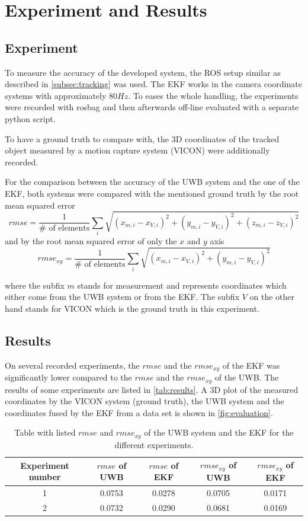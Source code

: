 \chapter{Experiment and Results}

\section{Experiment}
To measure the accuracy of the developed system, the ROS setup similar as described in \autoref{subsec:tracking} was used. The EKF works in the camera coordinate systems with approximately $80\mathit{Hz}$. To eases the whole handling, the experiments were recorded with rosbag and then afterwards off-line evaluated with a separate python script.

To have a ground truth to compare with, the 3D coordinates of the tracked object measured by a motion capture system (VICON) were additionally recorded.

For the comparison between the accuracy of the UWB system and the one of the EKF, both systems were compared with the mentioned ground truth by the root mean squared error $$\textit{rmse} = \frac{1}{\#\text{ of elements}} \sum_i \sqrt{(x_{m,i} - x_{V,i})^2 + (y_{m,i} - y_{V,i})^2 + (z_{m,i} - z_{V,i})^2}$$
and by the root mean squared error of only the $x$ and $y$ axis
$$\textit{rmse}_{xy} = \frac{1}{\#\text{ of elements}} \sum_i \sqrt{(x_{m,i} - x_{V,i})^2 + (y_{m,i} - y_{V,i})^2}$$

where the subfix $m$ stands for measurement and represents coordinates which either come from the UWB system or from the EKF. The subfix $V$ on the other hand stands for VICON which is the ground truth in this experiment. 

\section{Results}
On several recorded experiments, the $\textit{rmse}$ and the $\textit{rmse}_{xy}$ of the EKF was significantly lower compared to the $\textit{rmse}$ and the $\textit{rmse}_{xy}$ of the UWB. The results of some experiments are listed in \autoref{tab:results}. A 3D plot of the measured coordinates by the VICON system (ground truth), the UWB system and the coordinates fused by the EKF from a data set is shown in \autoref{fig:evaluation}.

\begin{table}[ht!]
\begin{center}
\begin{tabular}{c|c|c|c|c}
	Experiment number & $\textit{rmse}$ of UWB & $\textit{rmse}$ of EKF & $\textit{rmse}_{xy}$ of UWB & $\textit{rmse}_{xy}$ of EKF\\ 
	\hline 
	1 & 0.0753 & 0.0278 & 0.0705 & 0.0171 \\
	2 & 0.0732 & 0.0290 & 0.0681 & 0.0169 \\ 
\end{tabular}
\end{center}
\caption{Table with listed $\textit{rmse}$ and $\textit{rmse}_{xy}$ of the UWB system and the EKF for the different experiments.}
\label{tab:results}
\end{table}

